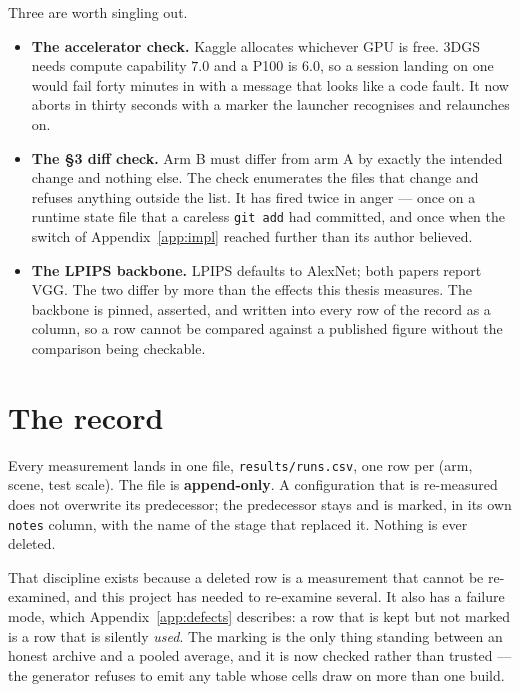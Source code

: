 Three are worth singling out.

\begin{itemize}[leftmargin=1.4em,itemsep=3pt]
  \item \textbf{The accelerator check.} Kaggle allocates whichever GPU is free.
        3DGS needs compute capability $7.0$ and a P100 is $6.0$, so a session
        landing on one would fail forty minutes in with a message that looks like
        a code fault. It now aborts in thirty seconds with a marker the launcher
        recognises and relaunches on.
  \item \textbf{The \S3 diff check.} Arm B must differ from arm A by exactly the
        intended change and nothing else. The check enumerates the files that
        change and refuses anything outside the list. It has fired twice in
        anger --- once on a runtime state file that a careless \texttt{git add}
        had committed, and once when the switch of Appendix~\ref{app:impl}
        reached further than its author believed.
  \item \textbf{The LPIPS backbone.} LPIPS defaults to AlexNet; both papers
        report VGG. The two differ by more than the effects this thesis
        measures. The backbone is pinned, asserted, and written into every row
        of the record as a column, so a row cannot be compared against a
        published figure without the comparison being checkable.
\end{itemize}

\section{The record}
\label{app:record}

Every measurement lands in one file, \texttt{results/runs.csv}, one row per
(arm, scene, test scale). The file is \textbf{append-only}. A configuration that
is re-measured does not overwrite its predecessor; the predecessor stays and is
marked, in its own \texttt{notes} column, with the name of the stage that
replaced it. Nothing is ever deleted.

That discipline exists because a deleted row is a measurement that cannot be
re-examined, and this project has needed to re-examine several. It also has a
failure mode, which Appendix~\ref{app:defects} describes: a row that is kept but
not marked is a row that is silently \emph{used}. The marking is the only thing
standing between an honest archive and a pooled average, and it is now checked
rather than trusted --- the generator refuses to emit any table whose cells draw
on more than one build.

